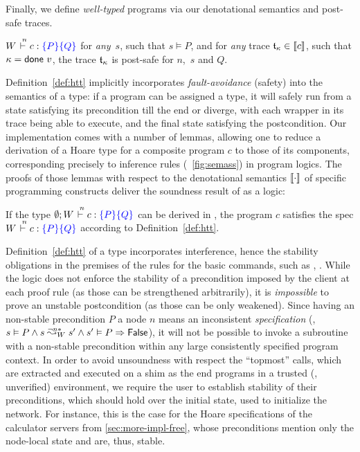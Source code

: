%
\noindent
%
Finally, we define \emph{well-typed} programs via our denotational
semantics and post-safe traces.
%
\begin{definition}
\label{def:htt}
$W \vd{n} c: \pre{P}\post{Q}$ \Iff for \emph{any}~$s$,
such that $s \vDash P$, and for \emph{any} trace $\mathfrak{t}_{\kappa} \in \llbracket{c}\rrbracket$,
such that $\kappa = \mathsf{done}~v$, the trace $\mathfrak{t}_{\kappa}$ is post-safe for
$n$,~$s$ and $Q$.
\end{definition}
%
%
Definition~\ref{def:htt} implicitly incorporates
\emph{fault-avoidance} (safety) into the semantics of a type: if a
program can be assigned a type, it will safely run from a state
satisfying its precondition till the end or diverge, with each wrapper
in its trace being able to execute, and the final state satisfying the
postcondition.
%
Our implementation comes with a number of lemmas, allowing one to
reduce a derivation of a Hoare type for a composite program $c$ to
those of its components, corresponding precisely to inference rules
(\cf~\cref{fig:semass}) in program logics.
%
The proofs of those lemmas with respect to the denotational semantics
$\llbracket{\cdot}\rrbracket$ of specific programming constructs deliver the
soundness result of \disel as a logic:
%
\begin{theorem}
  If the type $\emptyset; W \vd{n} c: \specK{P} \specK{Q}$ can be
  derived in \disel, the program $c$ satisfies the spec
  $W \vd{n} c: \pre{P}\post{Q}$ according to Definition~\ref{def:htt}.
\end{theorem}
%
Definition~\ref{def:htt} of a type incorporates interference, hence
the stability obligations in the premises of the rules for the basic
commands, such as , .
%
While the logic does not enforce the stability of a precondition
imposed by the client at each proof rule (as those can be strengthened
arbitrarily), it is \emph{impossible} to prove an unstable
postcondition (as those can be only weakened). Since having an
non-stable precondition $P$ \wrt a node $n$ means an inconsistent
\emph{specification} (\ie,
$s \vDash P \aand \ninf{W}{n}{s}{s'} \aand s' \vDash P \Rightarrow
\False$),
it will not be possible to invoke a subroutine with a non-stable
precondition within any large consistently specified program context.
%
In order to avoid unsoundness with respect the ``topmost'' calls,
which are extracted and executed on a shim as the end programs in a
trusted (\ie, unverified) environment, we require the user to
establish stability of their preconditions, which should hold over the
initial state, used to initialize the network.
%
For instance, this is the case for the Hoare specifications of the
calculator servers from \cref{sec:more-impl-free}, whose
preconditions mention only the node-local state and are, thus, stable.

